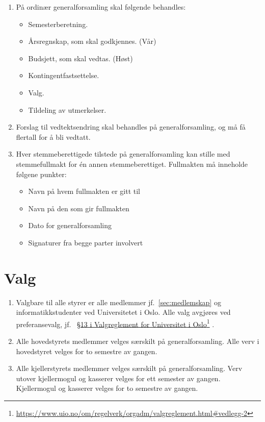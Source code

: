 \documentclass[8pt,norsk,a4paper]{article}
\newcommand\fhref[2]{%
	\href{#1}{#2}\footnote{\url{#1}}%
}
\begin{document}
\begin{enumerate}
	\item{På ordinær generalforsamling skal følgende behandles:}
	\begin{itemize}
		\item{Semesterberetning.}
		\item{Årsregnskap, som skal godkjennes. (Vår)}
		\item{Budsjett, som skal vedtas. (Høst)}
		\item{Kontingentfastsettelse.}
		\item{Valg.}
		\item{Tildeling av utmerkelser.}
	\end{itemize}
	\item{Forslag til vedtektsendring skal behandles på generalforsamling, og må få  flertall for å bli vedtatt.}
	\item{Hver stemmeberettigede tilstede på generalforsamling kan stille med stemmefullmakt for én annen stemmeberettiget.
Fullmakten må inneholde følgene punkter:}
\begin{itemize}
\item{Navn på hvem fullmakten er gitt til}
\item{Navn på den som gir fullmakten}
\item{Dato for generalforsamling}
\item{Signaturer fra begge parter involvert}
\end{itemize}
\end{enumerate}

\section{Valg}\label{sec:valg}
\begin{enumerate}
	\item{Valgbare til alle styrer er alle medlemmer jf.~\ref{sec:medlemskap} og informatikkstudenter ved Universitetet i Oslo. Alle valg avgjøres ved preferansevalg, jf.~\fhref{https://www.uio.no/om/regelverk/orgadm/valgreglement.html\#vedlegg-2}{§13 i Valgreglement for Universitet i Oslo}.}
	\item{Alle hovedstyrets medlemmer velges særskilt på generalforsamling. Alle verv i hovedstyret velges for to semestre av gangen.}
	\item{Alle kjellerstyrets medlemmer velges særskilt på generalforsamling. Verv utover kjellermogul og kasserer velges for ett semester av gangen. Kjellermogul og kasserer velges for to semestre av gangen. }
\end{enumerate}
\end{document}
